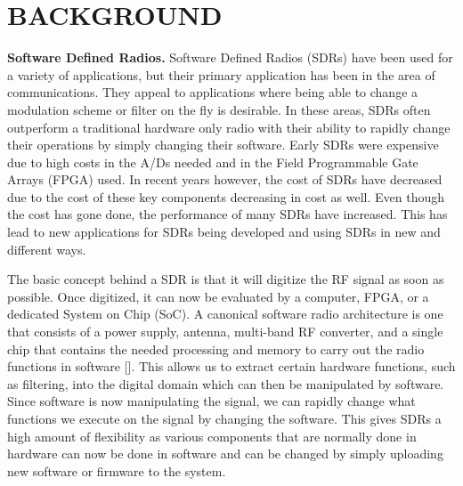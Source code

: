 \chapter{BACKGROUND}




\textbf{Software Defined Radios.} Software Defined Radios (SDRs) have been used for a variety of applications, but their primary application has been in the area of communications.  They appeal to applications where being able to change a modulation scheme or filter on the fly is desirable.  In these areas, SDRs often outperform a traditional hardware only radio with their ability to rapidly change their operations by simply changing their software.  Early SDRs were expensive due to high costs in the A/Ds needed and in the Field Programmable Gate Arrays (FPGA) used.  In recent years however, the cost of SDRs have decreased due to the cost of these key components decreasing in cost as well.  Even though the cost has gone done, the performance of many SDRs have increased.  This has lead to new applications for SDRs being developed and using SDRs in new and different ways.

The basic concept behind a SDR is that it will digitize the RF signal as soon as possible.  Once digitized, it can now be evaluated by a computer, FPGA, or a dedicated System on Chip (SoC).  A canonical software radio architecture is one that consists of a power supply, antenna, multi-band RF converter, and a single chip that contains the needed processing and memory to carry out the radio functions in software [\cite{Mitola1995}].  This allows us to extract certain hardware functions, such as filtering, into the digital domain which can then be manipulated by software.  Since software is now manipulating the signal, we can rapidly change what functions we execute on the signal by changing the software.  This gives SDRs a high amount of flexibility as various components that are normally done in hardware can now be done in software and can be changed by simply uploading new software or firmware to the system.  

